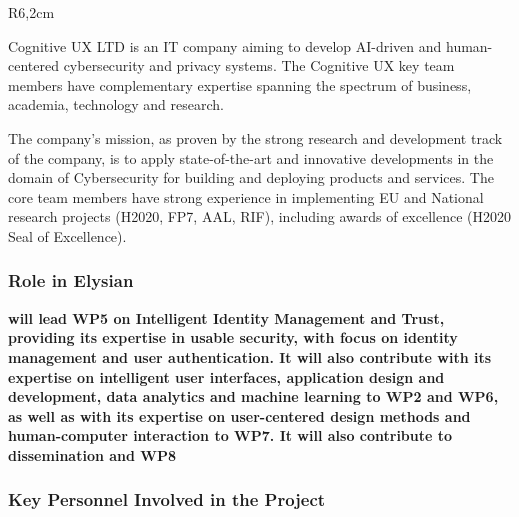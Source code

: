 \documentclass[a4paper,11pt]{article}
\begin{document}

\begin{wrapfigure}{R}{6,2cm}
\vspace{-3cm}
\hfill {}
\vspace{-1cm}
\end{wrapfigure}
\vspace{10pt}

Cognitive UX LTD is an IT company aiming to develop AI-driven and human-centered cybersecurity and privacy systems. The Cognitive UX key team members have complementary expertise spanning the spectrum of business, academia, technology and research. 

The company’s mission, as proven by the strong research and development track of the company, is to apply state-of-the-art and innovative developments in the domain of Cybersecurity for building and deploying products and services. The core team members have strong experience in implementing EU and National research projects (H2020, FP7, AAL, RIF), including awards of excellence (H2020 Seal of Excellence).

\subsubsection*{Role in Elysian}
\textbf{\COGNIshort{} will lead WP5 on Intelligent Identity Management and Trust, providing its expertise in usable security, with focus on identity management and user authentication. It will also contribute with its expertise on intelligent user interfaces, application design and development, data analytics and machine learning to WP2 and WP6, as well as with its expertise on user-centered design methods and human-computer interaction to WP7. It will also contribute to dissemination and WP8}

\subsubsection*{Key Personnel Involved in the Project}
\end{document}
